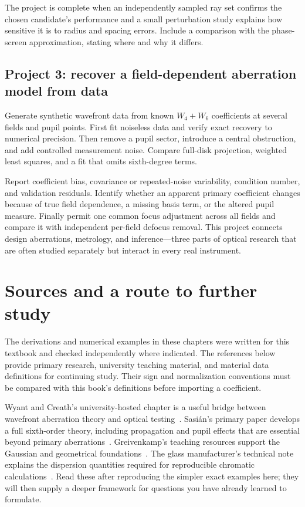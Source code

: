 The project is complete when an independently sampled ray set confirms the
chosen candidate's performance and a small perturbation study explains how
sensitive it is to radius and spacing errors. Include a comparison with the
phase-screen approximation, stating where and why it differs.

\section{Project 3: recover a field-dependent aberration model from data}
Generate synthetic wavefront data from known $W_4+W_6$ coefficients at several
fields and pupil points. First fit noiseless data and verify exact recovery
to numerical precision. Then remove a pupil sector, introduce a central
obstruction, and add controlled measurement noise. Compare full-disk
projection, weighted least squares, and a fit that omits sixth-degree terms.

Report coefficient bias, covariance or repeated-noise variability, condition
number, and validation residuals. Identify whether an apparent primary
coefficient changes because of true field dependence, a missing basis term,
or the altered pupil measure. Finally permit one common focus adjustment
across all fields and compare it with independent per-field defocus removal.
This project connects design aberrations, metrology, and inference---three
parts of optical research that are often studied separately but interact in
every real instrument.

\chapter*{Sources and a route to further study}
The derivations and numerical examples in these chapters were written for
this textbook and checked independently where indicated. The references
below provide primary research, university teaching material, and material
data definitions for continuing study. Their sign and normalization
conventions must be compared with this book's definitions before importing
a coefficient.

Wyant and Creath's university-hosted chapter is a useful bridge between
wavefront aberration theory and optical testing~\cite{wyantcreath}.
Sasi\'an's primary paper develops a full sixth-order theory, including
propagation and pupil effects that are essential beyond primary
aberrations~\cite{sas2010}. Greivenkamp's teaching resources support the
Gaussian and geometrical foundations~\cite{greivenkamp502}. The glass
manufacturer's technical note explains the dispersion quantities required
for reproducible chromatic calculations~\cite{schottTIE29}. Read these after
reproducing the simpler exact examples here; they will then supply a deeper
framework for questions you have already learned to formulate.

